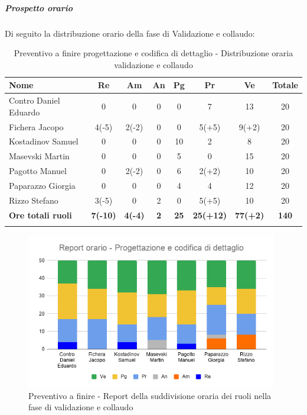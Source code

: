 \documentclass[../piano_di_progetto.tex]{subfiles}
\begin{document}
\subparagraph{Prospetto orario}
Di seguito la distribuzione orario della fase di Validazione e collaudo:
\begin{center}
	\begin{longtable}{|l|c|c|c|c|c|c|c|}
		\hline
		\rowcolor{lightgray}
		\textbf{Nome} & \textbf{Re} & \textbf{Am} & \textbf{An} & \textbf{Pg}  & \textbf{Pr}   & \textbf{Ve} & \textbf{Totale} \\

		\hline
			Contro Daniel Eduardo & 0 & 0 & 0 & 0 & 7 & 13 & 20\\
			Fichera Jacopo & 4(-5) & 2(-2) & 0 & 0 & 5(+5) & 9(+2) & 20 \\ 
			Kostadinov Samuel & 0 & 0 & 0 & 10 & 2 & 8 & 20 \\ 		
			Masevski Martin & 0 & 0 & 0 & 5 & 0 & 15 & 20 \\
			Pagotto Manuel & 0 & 2(-2) & 0 & 6 & 2(+2) & 10 & 20 \\			
			Paparazzo Giorgia & 0 & 0 & 0 & 4 & 4 & 12 & 20 \\
			Rizzo Stefano & 3(-5) & 0 & 2 & 0 & 5(+5) & 10 & 20 \\
			\hline
			\textbf{Ore totali ruoli} & \textbf{7(-10)} & \textbf{4(-4)} & \textbf{2} & \textbf{25} & \textbf{25(+12)} & \textbf{77(+2)} & \textbf{140} \\
			\hline
		\rowcolor{white}
		\caption{Preventivo a finire progettazione e codifica di dettaglio - Distribuzione oraria validazione e collaudo}
	\end{longtable}
\end{center}

\begin{figure}[H]
	\centering
	\includegraphics[width=11cm]{src/img/report/report_validazione_collaudo_consuntivo}
	\caption{Preventivo a finire - Report della suddivisione oraria dei ruoli nella fase di validazione e collaudo}
\end{figure}
\end{document}
